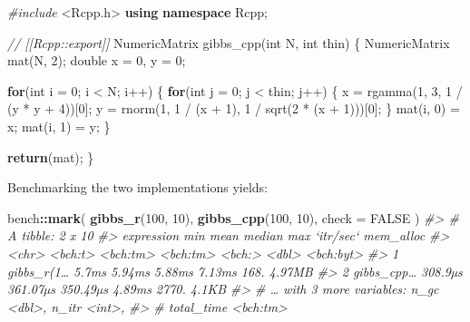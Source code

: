 \documentclass[]{book}
\newenvironment{Shaded}{\begin{snugshade}}{\end{snugshade}}
\newcommand{\CommentTok}[1]{\textcolor[rgb]{0.37,0.37,0.37}{\textit{#1}}}
\newcommand{\ControlFlowTok}[1]{\textcolor[rgb]{0.27,0.27,0.27}{\textbf{#1}}}
\newcommand{\DataTypeTok}[1]{\textcolor[rgb]{0.27,0.27,0.27}{#1}}
\newcommand{\DecValTok}[1]{\textcolor[rgb]{0.06,0.06,0.06}{#1}}
\newcommand{\ImportTok}[1]{#1}
\newcommand{\KeywordTok}[1]{\textcolor[rgb]{0.27,0.27,0.27}{\textbf{#1}}}
\newcommand{\NormalTok}[1]{#1}
\newcommand{\OperatorTok}[1]{\textcolor[rgb]{0.43,0.43,0.43}{\textbf{#1}}}
\newcommand{\OtherTok}[1]{\textcolor[rgb]{0.37,0.37,0.37}{#1}}
\newcommand{\PreprocessorTok}[1]{\textcolor[rgb]{0.37,0.37,0.37}{\textit{#1}}}
\begin{document}
\begin{Shaded}
\begin{Highlighting}[]
\PreprocessorTok{#include }\ImportTok{<Rcpp.h>}
\KeywordTok{using} \KeywordTok{namespace}\NormalTok{ Rcpp;}

\CommentTok{// [[Rcpp::export]]}
\NormalTok{NumericMatrix gibbs_cpp(}\DataTypeTok{int}\NormalTok{ N, }\DataTypeTok{int}\NormalTok{ thin) \{}
\NormalTok{  NumericMatrix mat(N, }\DecValTok{2}\NormalTok{);}
  \DataTypeTok{double}\NormalTok{ x = }\DecValTok{0}\NormalTok{, y = }\DecValTok{0}\NormalTok{;}

  \ControlFlowTok{for}\NormalTok{(}\DataTypeTok{int}\NormalTok{ i = }\DecValTok{0}\NormalTok{; i < N; i++) \{}
    \ControlFlowTok{for}\NormalTok{(}\DataTypeTok{int}\NormalTok{ j = }\DecValTok{0}\NormalTok{; j < thin; j++) \{}
\NormalTok{      x = rgamma(}\DecValTok{1}\NormalTok{, }\DecValTok{3}\NormalTok{, }\DecValTok{1}\NormalTok{ / (y * y + }\DecValTok{4}\NormalTok{))[}\DecValTok{0}\NormalTok{];}
\NormalTok{      y = rnorm(}\DecValTok{1}\NormalTok{, }\DecValTok{1}\NormalTok{ / (x + }\DecValTok{1}\NormalTok{), }\DecValTok{1}\NormalTok{ / sqrt(}\DecValTok{2}\NormalTok{ * (x + }\DecValTok{1}\NormalTok{)))[}\DecValTok{0}\NormalTok{];}
\NormalTok{    \}}
\NormalTok{    mat(i, }\DecValTok{0}\NormalTok{) = x;}
\NormalTok{    mat(i, }\DecValTok{1}\NormalTok{) = y;}
\NormalTok{  \}}

  \ControlFlowTok{return}\NormalTok{(mat);}
\NormalTok{\}}
\end{Highlighting}
\end{Shaded}

Benchmarking the two implementations yields:

\begin{Shaded}
\begin{Highlighting}[]
\NormalTok{bench}\OperatorTok{::}\KeywordTok{mark}\NormalTok{(}
  \KeywordTok{gibbs_r}\NormalTok{(}\DecValTok{100}\NormalTok{, }\DecValTok{10}\NormalTok{),}
  \KeywordTok{gibbs_cpp}\NormalTok{(}\DecValTok{100}\NormalTok{, }\DecValTok{10}\NormalTok{),}
  \DataTypeTok{check =} \OtherTok{FALSE}
\NormalTok{)}
\CommentTok{#> # A tibble: 2 x 10}
\CommentTok{#>   expression     min     mean   median    max `itr/sec` mem_alloc}
\CommentTok{#>   <chr>      <bch:t> <bch:tm> <bch:tm> <bch:>     <dbl> <bch:byt>}
\CommentTok{#> 1 gibbs_r(1…   5.7ms   5.94ms   5.88ms 7.13ms      168.    4.97MB}
\CommentTok{#> 2 gibbs_cpp… 308.9µs 361.07µs 350.49µs 4.89ms     2770.     4.1KB}
\CommentTok{#> # … with 3 more variables: n_gc <dbl>, n_itr <int>,}
\CommentTok{#> #   total_time <bch:tm>}
\end{Highlighting}
\end{Shaded}
\end{document}
